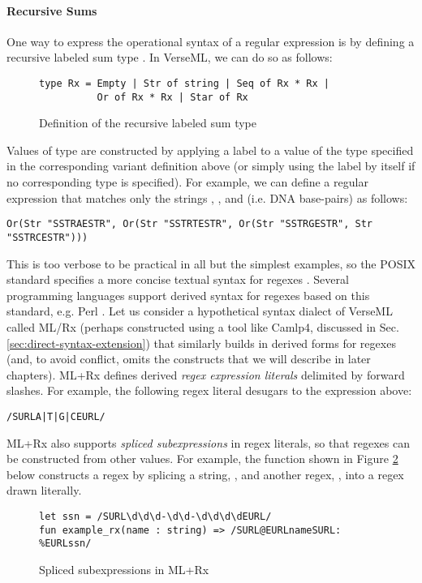 \paragraph{Recursive Sums}
One way to express the operational syntax of a regular expression is by defining a recursive labeled sum type \cite{pfpl}. In VerseML, we can do so as follows:

\begin{figure}[ht]
\begin{lstlisting}[numbers=none]
type Rx = Empty | Str of string | Seq of Rx * Rx | 
          Or of Rx * Rx | Star of Rx
\end{lstlisting}
\caption{Definition of the recursive labeled sum type }
\label{fig:datatype-rx}
\end{figure}

Values of type  are constructed by applying a label to a value of the type specified in the corresponding variant definition above (or simply using the label by itself if no corresponding type is specified). For example, we can define a regular expression that matches only the strings , ,  and  (i.e. DNA base-pairs) as follows:
\begin{lstlisting}[numbers=none]
Or(Str "SSTRAESTR", Or(Str "SSTRTESTR", Or(Str "SSTRGESTR", Str "SSTRCESTR")))
\end{lstlisting}

This is too verbose to be practical  in all but the simplest examples, so the POSIX standard specifies a more concise textual syntax for regexes \cite{STD95954}. Several programming languages support derived syntax for regexes based on this standard, e.g. Perl \cite{books/daglib/0028711}. Let us consider a hypothetical syntax dialect of VerseML called ML/Rx (perhaps constructed using a tool like Camlp4, discussed in Sec. \ref{sec:direct-syntax-extension}) that similarly builds in derived forms for regexes (and, to avoid conflict, omits the constructs that we will describe in later chapters). ML+Rx defines derived \emph{regex expression literals} delimited by forward slashes. For example, the following regex literal desugars to the expression above:
\begin{lstlisting}[numbers=none]
/SURLA|T|G|CEURL/
\end{lstlisting}

ML+Rx also supports \emph{spliced subexpressions} in regex literals, so that regexes can be constructed from other values. For example, the function  shown in Figure \ref{fig:derived-spliced-subexpressions} below constructs a regex by splicing a string, , and another regex, , into a regex drawn literally.
\begin{figure}[ht]
\begin{lstlisting}[numbers=none]
let ssn = /SURL\d\d\d-\d\d-\d\d\d\dEURL/
fun example_rx(name : string) => /SURL@EURLnameSURL: %EURLssn/
\end{lstlisting}
\caption{Spliced subexpressions in ML+Rx}
\label{fig:derived-spliced-subexpressions}
\end{figure}

